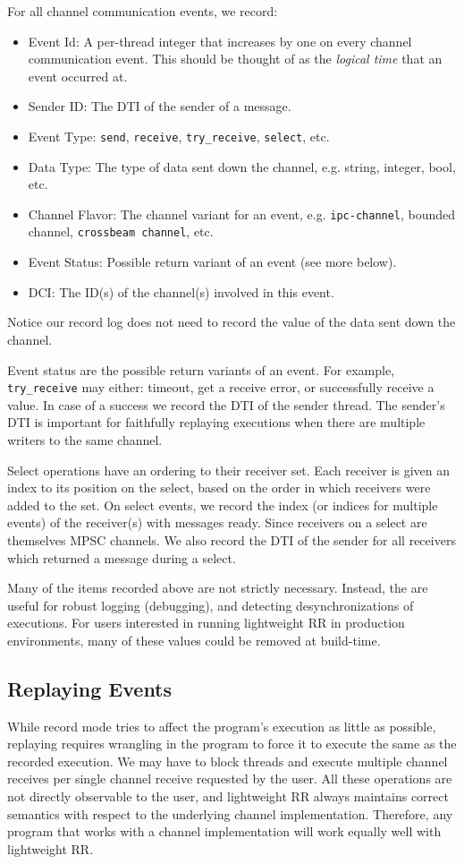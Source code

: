 For all channel communication events, we record:
\begin{itemize}
\item Event Id: A per-thread integer that increases by one on every channel communication
  event. This should be thought of as the \textit{logical time} that an event occurred at.
\item Sender ID: The DTI of the sender of a message.
\item Event Type: \texttt{send}, \texttt{receive}, \texttt{try\_receive}, \texttt{select}, etc.
\item Data Type: The type of data sent down the channel, e.g. string, integer, bool, etc.
\item Channel Flavor: The channel variant for an event, e.g. \texttt{ipc-channel}, bounded channel,
  \texttt{crossbeam channel}, etc.
\item Event Status: Possible return variant of an event (see more below).
\item DCI: The ID(s) of the channel(s) involved in this event.
\end{itemize}
Notice our record log does not need to record the value of the data sent down the channel.

Event status are the possible return variants of an event. For example, \texttt{try\_receive}
may either: timeout, get a receive error, or successfully receive a value. In case of a
success we record the DTI of the sender thread. The sender's DTI is
important for faithfully replaying executions when there are multiple writers
to the same channel.

Select operations have an ordering to their receiver set. Each receiver is given
an index to its position on the select, based on the order in which receivers were added to
the set. On select events, we record the index (or indices for multiple events) of the
receiver(s) with messages ready. Since receivers on a select are themselves MPSC channels. We
also record the DTI of the sender for all receivers which returned a message during a select.

Many of the items recorded above are not strictly necessary. Instead, the are useful for
robust logging (debugging), and detecting desynchronizations of executions. For users
interested in running lightweight RR in production environments, many of these values could
be removed at build-time.

\subsection{Replaying Events}
While record mode tries to affect the program's execution as little as possible,
replaying requires wrangling in the program to force it to execute the same as the recorded
execution. We may have to block threads and execute multiple channel receives
per single channel receive requested by the user. All these operations are not directly
observable to the user, and lightweight RR always maintains correct semantics with respect
to the underlying channel implementation. Therefore, any program that works with a channel
implementation will work equally well with lightweight RR.


